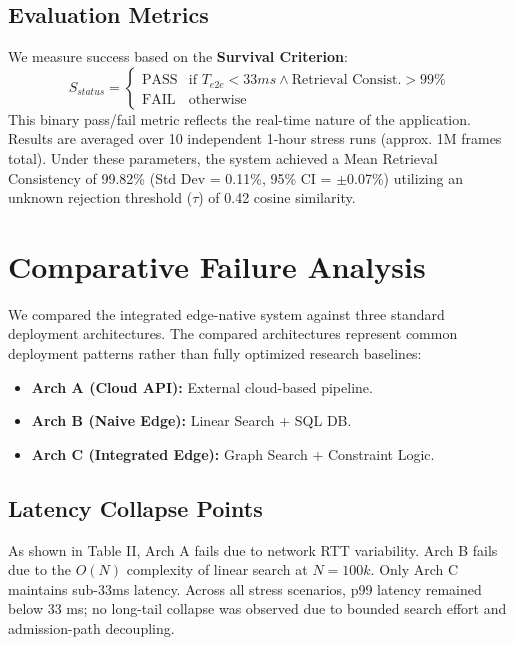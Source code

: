 \documentclass[conference]{IEEEtran}
\begin{document}
\subsection{Evaluation Metrics}
We measure success based on the \textbf{Survival Criterion}:
\begin{equation}
S_{status} = 
\begin{cases} 
\text{PASS} & \text{if } T_{e2e} < 33ms \land \text{Retrieval Consist.} > 99\% \\
\text{FAIL} & \text{otherwise}
\end{cases}
\end{equation}
This binary pass/fail metric reflects the real-time nature of the application. Results are averaged over 10 independent 1-hour stress runs (approx. 1M frames total). Under these parameters, the system achieved a Mean Retrieval Consistency of 99.82\% (Std Dev = 0.11\%, 95\% CI = $\pm$0.07\%) utilizing an unknown rejection threshold ($\tau$) of 0.42 cosine similarity. 

\section{Comparative Failure Analysis}

We compared the integrated edge-native system against three standard deployment architectures. The compared architectures represent common deployment patterns rather than fully optimized research baselines:
\begin{itemize}
    \item \textbf{Arch A (Cloud API):} External cloud-based pipeline.
    \item \textbf{Arch B (Naive Edge):} Linear Search + SQL DB.
    \item \textbf{Arch C (Integrated Edge):} Graph Search + Constraint Logic.
\end{itemize}

\subsection{Latency Collapse Points}
As shown in Table II, Arch A fails due to network RTT variability. Arch B fails due to the $O(N)$ complexity of linear search at $N=100k$. Only Arch C maintains sub-33ms latency. Across all stress scenarios, p99 latency remained below 33 ms; no long-tail collapse was observed due to bounded search effort and admission-path decoupling.
\end{document}
